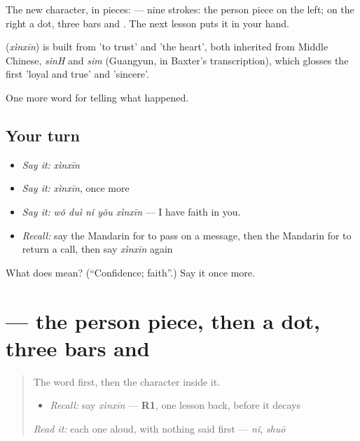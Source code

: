 The new character, in pieces:  — nine strokes: the person piece  on the left; on the right a dot, three bars and . The next lesson puts it in your hand.

\begin{cousinweb}
\textbf{} (\emph{xìnxīn}) is built from  'to trust' and  'the heart', both inherited from Middle Chinese, \emph{sinH} and \emph{sim} (Guangyun, in Baxter's transcription), which glosses the first 'loyal and true' and 'sincere'.
\end{cousinweb}

\begin{grammarlens}[title={What you've built}]
One more word for telling what happened.
\end{grammarlens}

\subsection*{Your turn}
\begin{itemize}
\raggedright
  \item \emph{Say it:} \emph{xìnxīn}
  \item \emph{Say it:} \emph{xìnxīn}, once more
  \item \emph{Say it:} \emph{wǒ duì nǐ yǒu xìnxīn} — I have faith in you.
  \item \emph{Recall:} say the Mandarin for to pass on a message, then the Mandarin for to return a call, then say \emph{xìnxīn} again
\end{itemize}

\begin{tcolorbox}[breakable,colback=teal!4,colframe=teal!35!black,title={Before you move on}]
What does  mean? (\textquotedblleft{}Confidence; faith\textquotedblright{}.) Say it once more.
\end{tcolorbox}
\section[\texorpdfstring{\zh{信} (xìn)}{信 (xìn)}]{ — the person piece, then a dot, three bars and }

\label{lesson:ZH-W319-xin-letter}



\begin{quote}
The word first, then the character inside it.

\begin{itemize}
\raggedright
  \item \emph{Recall:} say \emph{xìnxīn} — \textbf{R1}, one lesson back, before it decays
\end{itemize}

\begin{quote}
 
\end{quote}

\emph{Read it:} each one aloud, with nothing said first — \emph{nǐ}, \emph{shuō}
\end{quote}

